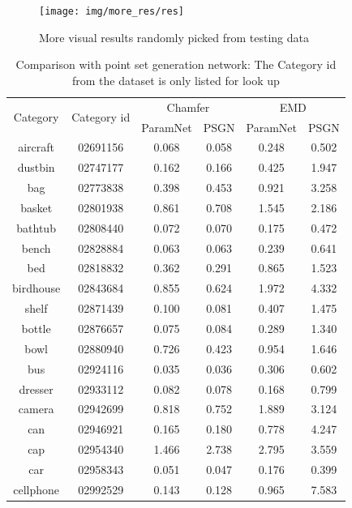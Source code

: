\begin{figure}[htbp]
	\centering
	\texttt{[image: img/more\_res/res]}
	\caption{More visual results randomly picked from testing data}
	\label{fig:more_res}
\end{figure}

\begin{table}
	\caption{Comparison with point set generation network\cite{PSGN}: The Category id from the dataset\cite{shapenetdata} is only listed for look up}
	\label{tab:seg}
	\centering
	\begin{tabular}{c c c c c c}
		\multirow{2}{*}{Category} & \multirow{2}{*}{Category id} & \multicolumn{2}{c}{Chamfer} & \multicolumn{2}{c}{EMD}\\ \cmidrule(lr){3-4} \cmidrule(lr){5-6}
		&	& ParamNet & PSGN\cite{PSGN}       & ParamNet & PSGN\cite{PSGN}\\
		\hline
		aircraft & 02691156 & 0.068 & 0.058 & 0.248 & 0.502 \\   
		dustbin & 02747177 & 0.162 & 0.166 & 0.425 & 1.947 \\
		bag & 02773838  & 0.398 & 0.453 & 0.921 & 3.258 \\
		basket & 02801938 & 0.861 & 0.708 & 1.545 & 2.186 \\
		bathtub & 02808440 & 0.072 & 0.070 & 0.175 & 0.472 \\
		bench & 02828884 & 0.063 & 0.063 & 0.239 & 0.641 \\
		bed & 02818832 & 0.362 & 0.291 & 0.865 & 1.523 \\
		birdhouse & 02843684 & 0.855 & 0.624 & 1.972 & 4.332 \\
		shelf & 02871439 & 0.100 & 0.081 & 0.407 & 1.475 \\
		bottle & 02876657 & 0.075 & 0.084 & 0.289 & 1.340 \\
		bowl & 02880940 & 0.726 & 0.423 & 0.954 & 1.646 \\
		bus & 02924116 & 0.035 & 0.036 & 0.306 & 0.602\\
		dresser & 02933112 & 0.082 & 0.078 & 0.168 & 0.799 \\
		camera & 02942699 & 0.818 & 0.752 & 1.889 & 3.124 \\
		can & 02946921 & 0.165 & 0.180 & 0.778 & 4.247 \\
		cap & 02954340 & 1.466 & 2.738 & 2.795 & 3.559 \\
		car & 02958343 & 0.051 & 0.047 & 0.176 & 0.399 \\
		cellphone & 02992529 & 0.143  & 0.128  & 0.965  & 7.583 \\
		

\end{tabular}
\end{table}
